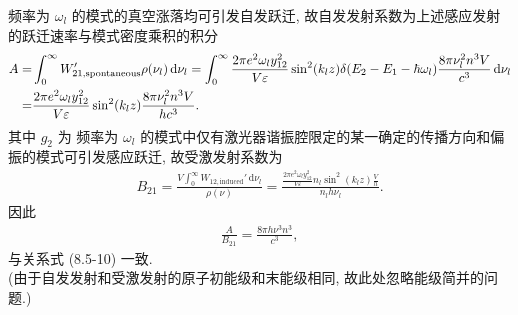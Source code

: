 \documentclass[twoside]{note}
\begin{document}
\begin{pf}
    频率为 $\omega_l$ 的模式的真空涨落均可引发自发跃迁, 故自发发射系数为上述感应发射的跃迁速率与模式密度乘积的积分
    \begin{align}
        \notag A=&\int_0^{\infty}W_{21,\text{spontaneous}}'\rho(\nu_l)\,\mathrm{d}\nu_l=\int_0^{\infty}\frac{2\pi e^2\omega_ly_{12}^2}{V\varepsilon}\sin^2(k_lz)\delta(E_2-E_1-\hbar\omega_l)\frac{8\pi\nu_l^2n^3V}{c^3}\,\mathrm{d}\nu_l\\
        =&\frac{2\pi e^2\omega_ly_{12}^2}{V\varepsilon}\sin^2(k_lz)\frac{8\pi\nu_l^2n^3V}{hc^3}.
    \end{align}
    其中 $g_2$ 为
    频率为 $\omega_l$ 的模式中仅有激光器谐振腔限定的某一确定的传播方向和偏振的模式可引发感应跃迁, 故受激发射系数为
    \begin{align}
        B_{21}=\frac{V\int_0^{\infty}W_{12,\text{induced}}'\,\mathrm{d}\nu_l}{\rho(\nu)}=\frac{\frac{2\pi e^2\omega_ly_{12}^2}{V\varepsilon}n_l\sin^2(k_lz)\frac{V}{h}}{n_lh\nu_l}.
    \end{align}
    因此
    \begin{align}
        \frac{A}{B_{21}}=\frac{8\pi h\nu^3n^3}{c^3},
    \end{align}
    与关系式 (8.5-10) 一致.\\
    (由于自发发射和受激发射的原子初能级和末能级相同, 故此处忽略能级简并的问题.)
\end{pf}
\end{document}
